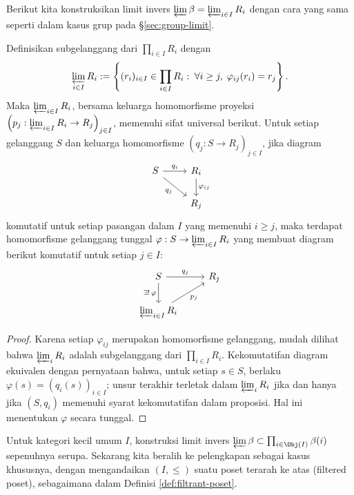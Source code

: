Berikut kita konstruksikan limit invers $\varprojlim \beta = \varprojlim_{i \in I} R_i$ dengan cara yang sama seperti dalam kasus grup pada \S\ref{sec:group-limit}.

\begin{proposition}
	Definisikan subgelanggang dari $\prod_{i \in I} R_i$ dengan
	\[ \varprojlim_{i \in I} R_i := \left\{ (r_i)_{i \in I} \in \prod_{i \in I} R_i : \; \forall i \geq j,\; \varphi_{ij}(r_i) = r_j \right\}. \]
	Maka $\varprojlim_{i \in I} R_i$, bersama keluarga homomorfisme proyeksi $\left( p_j: \varprojlim_{i \in I} R_i \to R_j \right)_{j \in I}$, memenuhi sifat universal berikut. Untuk setiap gelanggang $S$ dan keluarga homomorfisme $(q_j: S \to R_j)_{j \in I}$, jika diagram
	\[ \begin{tikzcd}
		S \arrow[r, "q_i"] \arrow[rd, "q_j"'] & R_i \arrow[d, "\varphi_{ij}"] \\
		&  R_j
	\end{tikzcd} \]
	komutatif untuk setiap pasangan dalam $I$ yang memenuhi $i \geq j$, maka terdapat homomorfisme gelanggang tunggal $\varphi: S \to \varprojlim_{i \in I} R_i$ yang membuat diagram berikut komutatif untuk setiap $j \in I$:
	\[ \begin{tikzcd}
		S \arrow[r, "q_j"] \arrow[d, "{\exists! \, \varphi}"'] & R_j \\
		\varprojlim_{i \in I} R_i \arrow[ru, "p_j"'] &
	\end{tikzcd} \]
\end{proposition}
\begin{proof}
	Karena setiap $\varphi_{ij}$ merupakan homomorfisme gelanggang, mudah dilihat bahwa $\varprojlim_i R_i$ adalah subgelanggang dari $\prod_{i \in I} R_i$. Kekomutatifan diagram ekuivalen dengan pernyataan bahwa, untuk setiap $s \in S$, berlaku $\varphi(s) = (q_i(s))_{i \in I}$; unsur terakhir terletak dalam $\varprojlim_i R_i$ jika dan hanya jika $(S, q_i)$ memenuhi syarat kekomutatifan dalam proposisi. Hal ini menentukan $\varphi$ secara tunggal.
\end{proof}

Untuk kategori kecil umum $I$, konstruksi limit invers $\varprojlim \beta \subset \prod_{i \in \Obj(I)} \beta(i)$ sepenuhnya serupa. Sekarang kita beralih ke pelengkapan sebagai kasus khususnya, dengan mengandaikan $(I, \leq)$ suatu poset terarah ke atas (filtered poset), sebagaimana dalam Definisi \ref{def:filtrant-poset}.

